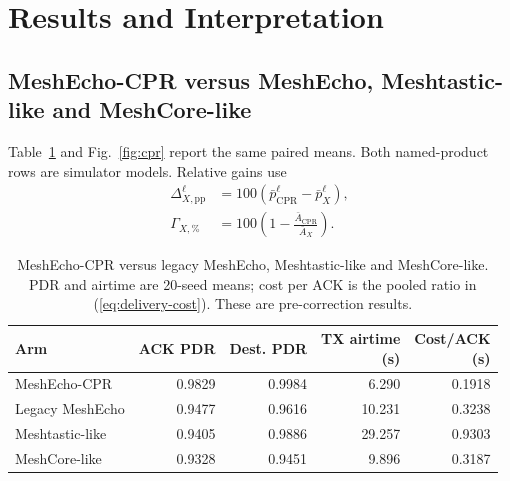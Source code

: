 \documentclass[conference,letterpaper,10pt]{IEEEtran}
\begin{document}
\section{Results and Interpretation}
\subsection{MeshEcho-CPR versus MeshEcho, Meshtastic-like and MeshCore-like}
Table~\ref{tab:holdout} and Fig.~\ref{fig:cpr} report the same paired means.
Both named-product rows are simulator models. Relative gains use
\begin{equation}
\begin{aligned}
\Delta_{X,\mathrm{pp}}^\ell
 &=100(\bar p_{\mathrm{CPR}}^\ell-\bar p_X^\ell),\\
\Gamma_{X,\%}&=100\left(1-\frac{\bar A_{\mathrm{CPR}}}{\bar A_X}\right).
\end{aligned}
\label{eq:four-way-contrast}
\end{equation}

\begin{table}[t]
\centering
\caption{MeshEcho-CPR versus legacy MeshEcho, Meshtastic-like and
MeshCore-like. PDR and airtime are 20-seed means; cost per ACK is the
pooled ratio in (\ref{eq:delivery-cost}). These are pre-correction results.}
\label{tab:holdout}
\footnotesize
\setlength{\tabcolsep}{2.5pt}
\begin{tabular}{@{}lrrrr@{}}
\toprule
Arm & ACK PDR & Dest. PDR & \shortstack{TX airtime\\(s)} & \shortstack{Cost/ACK\\(s)}\\
\midrule
MeshEcho-CPR & 0.9829 & 0.9984 & 6.290 & 0.1918\\
Legacy MeshEcho & 0.9477 & 0.9616 & 10.231 & 0.3238\\
Meshtastic-like & 0.9405 & 0.9886 & 29.257 & 0.9303\\
MeshCore-like & 0.9328 & 0.9451 & 9.896 & 0.3187\\
\bottomrule
\end{tabular}
\end{table}
\end{document}
